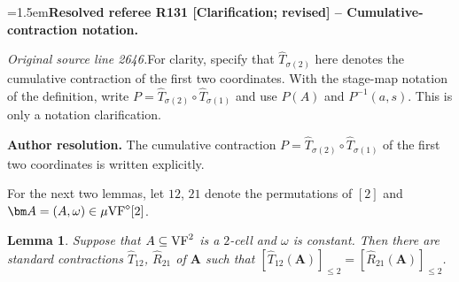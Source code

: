\documentclass[12pt]{amsart}
\newcommand{\ResolvedRefereeRemark}[5]{%
  \par\medskip\begingroup\normalfont\small\color{gray}%
  \emergencystretch=1.5em\noindent\textbf{Resolved referee R#1 [#2] -- #3.}\par\nobreak\noindent #4\par
  \medskip\color{ResolutionGreen}\noindent\textbf{Author resolution.} #5\par
  \endgroup\medskip
}
\theoremstyle{plain}
\newtheorem{lem}[thm]{Lemma}
\theoremstyle{definition}
\theoremstyle{remark}
\numberwithin{equation}{section}
\theoremstyle{plain}
\newcommand{\VF}{\textup{VF}}
\newcommand{\0}{\emptyset}
\newcommand{\sub}{\subseteq}
\newcommand{\mVF}{{\mu}{\VF}}
\begin{document}
\ResolvedRefereeRemark{131}{Clarification; revised}{Cumulative-contraction notation}{%
\textit{Original source line 2646.}\quad For clarity, specify that $\hat T_{\sigma(2)}$ here denotes the cumulative contraction of the first two coordinates. With the stage-map notation of the definition, write $P=\hat T_{\sigma(2)}\circ\hat T_{\sigma(1)}$ and use $P(A)$ and $P^{-1}(a,s)$. This is only a notation clarification.
}{The cumulative contraction $P=\hat T_{\sigma(2)}\circ\hat T_{\sigma(1)}$ of the first two coordinates is written explicitly.}


For the next two lemmas, let $12$, $21$ denote the permutations of $[2]$ and $\bm A = (A, \omega) \in \mVF^\diamond[2]$.


\begin{lem}\label{2:unit:contracted}
Suppose that $A \sub \VF^2$ is a $2$-cell and $\omega$ is constant. Then there are standard contractions $\hat T_{12}$, $\hat R_{21}$ of $\bm A$ such that $[\hat T_{12}(\bm A)]_{\leq 2} = [\hat R_{21}(\bm A)]_{\leq 2}$.
\end{lem}
\end{document}
